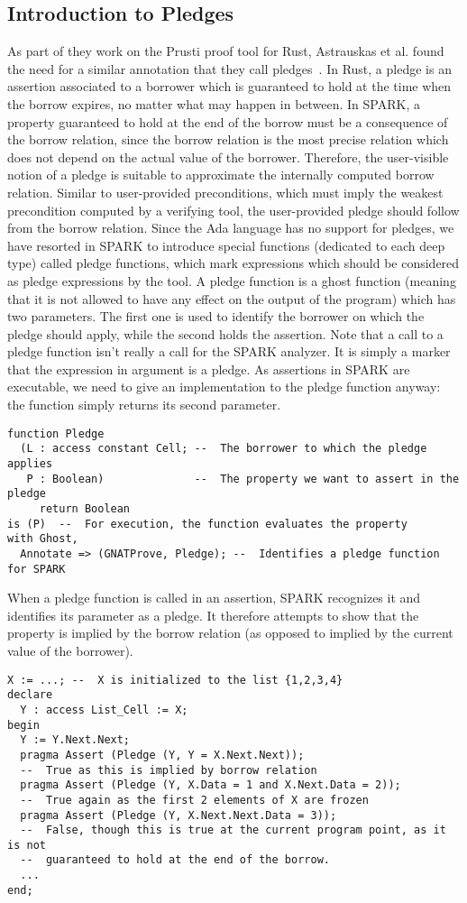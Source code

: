 \documentclass[runningheads]{llncs}
\begin{document}
\subsection{Introduction to Pledges}
As part of they work on the Prusti proof tool for Rust, Astrauskas et al. found the need for a similar annotation that they call pledges~\cite{astrauskas2019leveraging}. In Rust, a pledge is an assertion associated to a borrower which is guaranteed to hold at the time when the borrow expires, no matter what may happen in between. In SPARK, a property guaranteed to hold at the end of the borrow must be a consequence of the borrow relation, since the borrow relation is the most precise relation which does not depend on the actual value of the borrower. Therefore, the user-visible notion of a pledge is suitable to approximate the internally computed borrow relation. Similar to user-provided preconditions, which must imply the weakest precondition computed by a verifying tool, the user-provided pledge should follow from the borrow relation.
Since the Ada language has no support for pledges, we have resorted in SPARK to introduce special functions (dedicated to each deep type) called pledge functions, which mark expressions which should be considered as pledge expressions by the tool. A pledge function is a ghost function (meaning that it is not allowed to have any effect on the output of the program) which has two parameters. The first one is used to identify the borrower on which the pledge should apply, while the second holds the assertion.
Note that a call to a pledge function isn’t really a call for the SPARK analyzer. It is simply a marker that the expression in argument is a pledge. As assertions in SPARK are executable, we need to give an implementation to the pledge function anyway: the function simply returns its second parameter.
\begin{lstlisting}
function Pledge
  (L : access constant Cell; --  The borrower to which the pledge applies
   P : Boolean)              --  The property we want to assert in the pledge
     return Boolean
is (P)  --  For execution, the function evaluates the property
with Ghost,
  Annotate => (GNATProve, Pledge); --  Identifies a pledge function for SPARK
\end{lstlisting}
When a pledge function is called in an assertion, SPARK recognizes it and identifies its parameter as a pledge. It therefore attempts to show that the property is implied by the borrow relation (as opposed to implied by the current value of the borrower).
\begin{lstlisting}
X := ...; --  X is initialized to the list {1,2,3,4}
declare
  Y : access List_Cell := X;
begin
  Y := Y.Next.Next;
  pragma Assert (Pledge (Y, Y = X.Next.Next));
  --  True as this is implied by borrow relation
  pragma Assert (Pledge (Y, X.Data = 1 and X.Next.Data = 2));
  --  True again as the first 2 elements of X are frozen
  pragma Assert (Pledge (Y, X.Next.Next.Data = 3));
  --  False, though this is true at the current program point, as it is not
  --  guaranteed to hold at the end of the borrow.
  ...
end;
\end{lstlisting}
\end{document}
